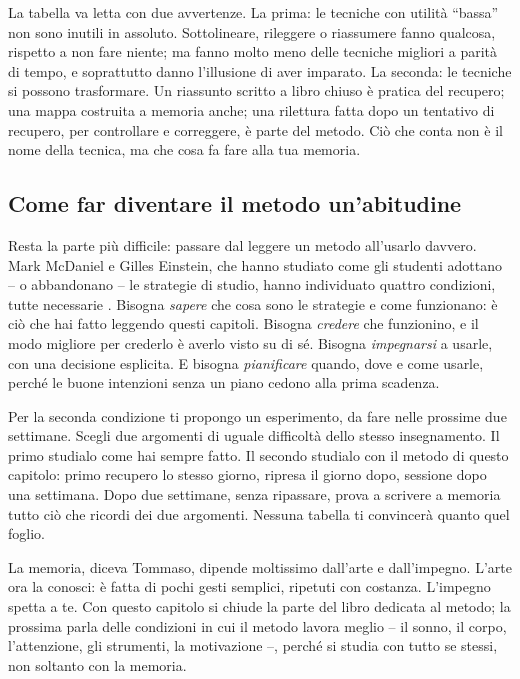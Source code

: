 La tabella va letta con due avvertenze. La prima: le tecniche con
utilità \enquote{bassa} non sono inutili in assoluto. Sottolineare,
rileggere o riassumere fanno qualcosa, rispetto a non fare niente; ma
fanno molto meno delle tecniche migliori a parità di tempo, e
soprattutto danno l'illusione di aver imparato. La seconda: le tecniche
si possono trasformare. Un riassunto scritto a libro chiuso è pratica
del recupero; una mappa costruita a memoria anche; una rilettura fatta
dopo un tentativo di recupero, per controllare e correggere, è parte
del metodo. Ciò che conta non è il nome della tecnica, ma che cosa fa
fare alla tua memoria.

\subsection*{Come far diventare il metodo un'abitudine}

Resta la parte più difficile: passare dal leggere un metodo all'usarlo
davvero. Mark McDaniel e Gilles Einstein, che hanno studiato come gli
studenti adottano -- o abbandonano -- le strategie di studio, hanno
individuato quattro condizioni, tutte necessarie
\parencite{mcdaniel2020}. Bisogna \emph{sapere} che cosa sono le
strategie e come funzionano: è ciò che hai fatto leggendo questi
capitoli. Bisogna \emph{credere} che funzionino, e il modo migliore per
crederlo è averlo visto su di sé. Bisogna \emph{impegnarsi} a usarle,
con una decisione esplicita. E bisogna \emph{pianificare} quando, dove e
come usarle, perché le buone intenzioni senza un piano cedono alla
prima scadenza.

Per la seconda condizione ti propongo un esperimento, da fare nelle
prossime due settimane. Scegli due argomenti di uguale difficoltà dello
stesso insegnamento. Il primo studialo come hai sempre fatto. Il
secondo studialo con il metodo di questo capitolo: primo recupero lo
stesso giorno, ripresa il giorno dopo, sessione dopo una settimana.
Dopo due settimane, senza ripassare, prova a scrivere a memoria tutto
ciò che ricordi dei due argomenti. Nessuna tabella ti convincerà quanto
quel foglio.

\asterismo

La memoria, diceva Tommaso, dipende moltissimo dall'arte e
dall'impegno. L'arte ora la conosci: è fatta di pochi gesti semplici,
ripetuti con costanza. L'impegno spetta a te. Con questo capitolo si
chiude la parte del libro dedicata al metodo; la prossima parla delle
condizioni in cui il metodo lavora meglio -- il sonno, il corpo,
l'attenzione, gli strumenti, la motivazione --, perché si studia con
tutto se stessi, non soltanto con la memoria.

